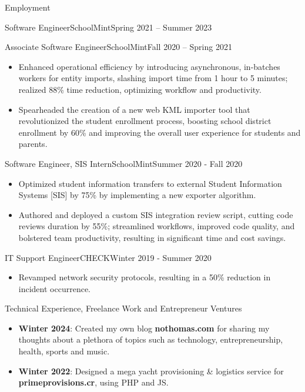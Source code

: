 \documentclass[]{mcdowellcv}
\begin{document}
\begin{cvsection}{Employment}
\begin{cvsubsection}{Software Engineer}{SchoolMint}{Spring 2021 -- Summer 2023}
\begin{itemize}
			\end{itemize}
		\end{cvsubsection}
		\begin{cvsubsection}{Associate Software Engineer}{SchoolMint}{Fall 2020 -- Spring 2021}	
			\begin{itemize}
				\item Enhanced operational efficiency by introducing asynchronous, in-batches workers for entity imports, slashing import time from 1 hour to 5 minutes; realized 88\% time reduction, optimizing workflow and productivity.
				\item Spearheaded the creation of a new web KML importer tool that revolutionized the student enrollment process, boosting school district enrollment by 60\% and improving the overall user experience for students and parents.
			\end{itemize}
		\end{cvsubsection}
		\begin{cvsubsection}{Software Engineer, SIS Intern}{SchoolMint}{Summer 2020 - Fall 2020}
			\begin{itemize}
				\item Optimized student information transfers to external Student Information Systems [SIS] by 75\% by implementing a new exporter algorithm.
				\item Authored and deployed a custom SIS integration review script, cutting code reviews duration by 55\%; streamlined workflows, improved code quality, and bolstered team productivity, resulting in significant time and cost savings.
			\end{itemize}
		\end{cvsubsection}
		\begin{cvsubsection}{IT Support Engineer}{CHECK}{Winter 2019 - Summer 2020}
			\begin{itemize}
				\item Revamped network security protocols, resulting in a 50\% reduction in incident occurrence.
			\end{itemize}
		\end{cvsubsection}
	\end{cvsection}
	\begin{cvsection}{Technical Experience, Freelance Work and Entrepreneur Ventures}
		\begin{cvsubsection}{}{}{}
			\begin{itemize}
				\item \textbf{Winter 2024}: Created my own blog \textbf{nothomas.com} for sharing my thoughts about a plethora of topics such as technology, entrepreneurship, health, sports and music.
			\end{itemize}
			\begin{itemize}
				\item \textbf{Winter 2022}: Designed a mega yacht provisioning \& logistics service for \textbf{primeprovisions.cr}, using PHP and JS.
			\end{itemize}
		\end{cvsubsection}
	\end{cvsection}
\end{document}
